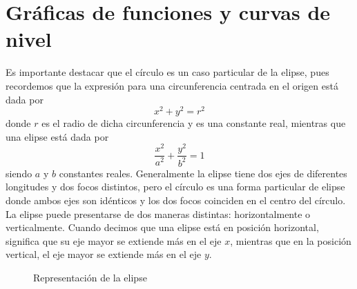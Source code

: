 \section{Gráficas de funciones y curvas de nivel}

\begin{reminder}
    Es importante destacar que el círculo es un caso particular de la elipse, pues recordemos que la expresión para una circunferencia centrada en el origen está dada por
    $$x^2 + y^2 = r^2$$
    donde $r$ es el radio de dicha circunferencia y es una constante real, mientras que una elipse está dada por
    $$\frac{x^2}{a^2} + \frac{y^2}{b^2} = 1$$
    siendo $a$ y $b$ constantes reales. Generalmente la elipse tiene dos ejes de diferentes longitudes y dos focos distintos, pero el círculo es una forma particular de elipse donde ambos ejes son idénticos y los dos focos coinciden en el centro del círculo. La elipse puede presentarse de dos maneras distintas: horizontalmente o verticalmente. Cuando decimos que una elipse está en posición horizontal, significa que su eje mayor se extiende más en el eje $x$, mientras que en la posición vertical, el eje mayor se extiende más en el eje $y$.
    \begin{figure}[h!]
        \centering
         \hfill
        \caption{Representación de la elipse}
    \end{figure}
    

\end{reminder}
